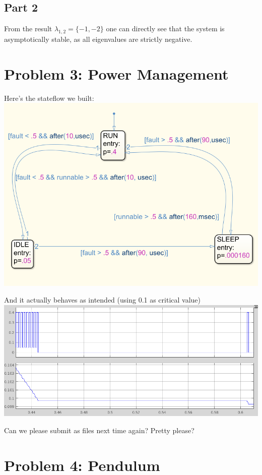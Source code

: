 \documentclass[a4paper,parskip,headheight=38pt]{scrartcl} %
\begin{document}
\subsection*{Part 2}

From the result $\lambda_{1,2} = \{-1, -2\}$ one can directly see that
the system is asymptotically stable, as all eigenvalues are strictly
negative.


\section*{Problem 3: Power Management}

Here's the stateflow we built:
 \\
\includegraphics[width=\textwidth]{p3-model}

And it actually behaves as intended (using 0.1 as critical value)
 \\
\includegraphics[width=\textwidth]{p3-proof}

Can we please submit as files next time again? Pretty please?


\section*{Problem 4: Pendulum}
\end{document}
